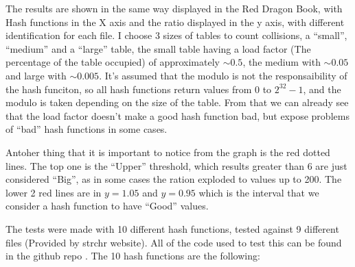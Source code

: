 The results are shown in the same way displayed in the Red Dragon Book, with Hash functions in the X axis and the ratio displayed in the y axis, with different identification for each file. I choose 3 sizes of tables to count collisions, a ``small'', ``medium'' and a ``large'' table, the small table having a load factor (The percentage of the table occupied) of approximately \( \sim 0.5 \), the medium with \( \sim 0.05 \) and large with \( \sim 0.005 \). It's assumed that the modulo is not the responsaibility of the hash funciton, so all hash functions return values from 0 to \( 2^{32} - 1 \), and the modulo is taken depending on the size of the table. From that we can already see that the load factor doesn't make a good hash function bad, but expose problems of ``bad'' hash functions in some cases. 

Antoher thing that it is important to notice from the graph is the red dotted lines. The top one is the ``Upper'' threshold, which results greater than 6 are just considered ``Big'', as in some cases the ration exploded to values up to 200. The lower 2 red lines are in \( y = 1.05 \) and \( y = 0.95 \) which is the interval that we consider a hash function to have ``Good'' values. 

The tests were made with 10 different hash functions, tested against 9 different files (Provided by strchr website). All of the code used to test this can be found in the github repo \cite{GithubRepo}. The 10 hash functions are the following:

